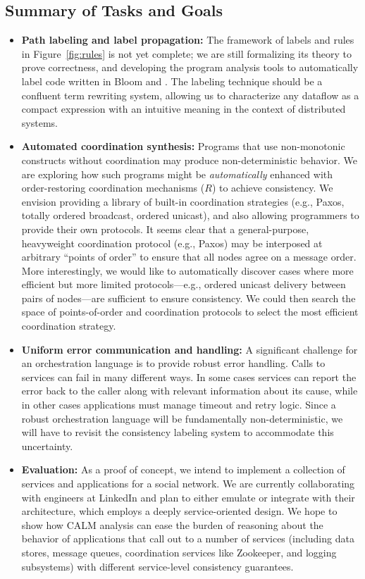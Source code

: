 \subsection{Summary of Tasks and Goals}
\begin{itemize}
\item \textbf{Path labeling and label propagation:}
The framework of labels and rules in Figure~\ref{fig:rules} is not yet complete; we are still formalizing its theory to prove correctness, and developing the program analysis tools to automatically label code written in Bloom and \blooml.  The labeling technique should be a confluent term rewriting system, allowing us to 
characterize any dataflow as a compact expression with an intuitive 
meaning in the context of distributed systems.

\item \textbf{Automated coordination synthesis:}
  Programs that use non-monotonic constructs without coordination may produce
  non-deterministic behavior. We are exploring how such programs might be
  \emph{automatically} enhanced with order-restoring coordination mechanisms
  ($R$) to achieve consistency. We envision providing a library of built-in
  coordination strategies (e.g., Paxos, totally ordered broadcast, ordered
  unicast), and also allowing programmers to provide their own protocols. It
  seems clear that a general-purpose, heavyweight coordination protocol (e.g., Paxos)
  may be interposed at arbitrary ``points of order'' to ensure that all nodes
  agree on a message order.  More interestingly, we would like to automatically
  discover cases where more efficient but more limited protocols---e.g.,
  ordered unicast delivery between pairs of nodes---are sufficient to ensure consistency.
  We could then search the space of points-of-order and coordination protocols
  to select the most efficient coordination strategy.

\item \textbf{Uniform error communication and handling:}
  A significant challenge for an orchestration language is to provide robust
  error handling. Calls to services can fail in many different ways. In some
  cases services can report the error back to the caller along with relevant
  information about its cause, while in other cases applications must manage
  timeout and retry logic.  Since a robust orchestration language will be
  fundamentally non-deterministic, we will have to revisit the consistency
  labeling system to accommodate this uncertainty.

\item \textbf{Evaluation:} As a proof of concept, we intend to implement a
  collection of services and applications for a social network.  We are currently
  collaborating with engineers at LinkedIn and plan to either emulate or
  integrate with their architecture, which employs a deeply service-oriented design.  We hope to show how CALM analysis can ease the burden of reasoning
  about the behavior of applications that call out to a number of services
  (including data stores, message queues, coordination services like Zookeeper,
  and logging subsystems) with different service-level consistency guarantees.

\end{itemize}


